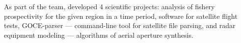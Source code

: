 As part of the team, developed 4 scientific projects: analysis of fishery prospectivity for the given region in a time period, software for satellite flight tests, GOCE-parser --- command-line tool for satellite file parsing, and radar equipment modeling --- algorithms of aerial aperture synthesis.
